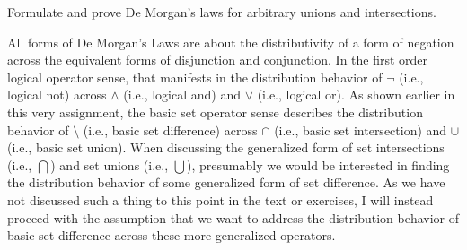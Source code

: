 \documentclass[../main.tex]{subfiles}
\begin{document}
\problem{}
Formulate and prove De Morgan's laws for arbitrary unions and intersections.

\begin{remark}
	All forms of De Morgan's Laws are about the distributivity of a form of
	negation across the equivalent forms of disjunction and conjunction. In
	the first order logical operator sense, that manifests in the
	distribution behavior of \(\neg\) (i.e., logical not) across \(\land\)
	(i.e., logical and) and \(\lor\) (i.e., logical or). As shown earlier in
	this very assignment, the basic set operator sense describes the
	distribution behavior of \(\setminus\) (i.e., basic set difference)
	across \(\cap\) (i.e., basic set intersection) and \(\cup\) (i.e., basic
	set union). When discussing the generalized form of set intersections
	(i.e., \(\bigcap\)) and set unions (i.e., \(\bigcup\)), presumably we
	would be interested in finding the distribution behavior of some
	generalized form of set difference. As we have not discussed such a
	thing to this point in the text or exercises, I will instead proceed
	with the assumption that we want to address the distribution behavior of
	basic set difference across these more generalized operators.
\end{remark}



\end{document}
